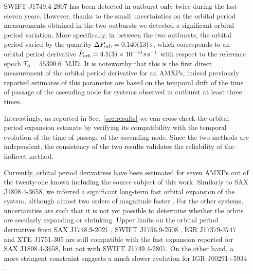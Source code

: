 \documentclass[fleqn,usenatbib]{mnras}
\newcommand{\swiftj}{SWIFT J1749.4-2807}
\begin{document}
\swiftj{} has been detected in outburst only twice during the last eleven years. However, thanks to the small uncertainties on the orbital period measurements obtained in the two outbursts we detected a significant orbital period variation. More specifically, in between the two outbursts, the orbital period varied by the quantity $\Delta P_{\rm orb}=0.140(13)\,\text{s}$, which corresponds to an orbital period derivative $\dot{P}_{\rm orb}=4.1(3)\times 10^{-10}\,\text{s}\,\text{s}^{-1}$ with respect to the reference epoch $T_0 = 55300.6$~MJD. It is noteworthy that this is the first direct measurement of the orbital period derivative for an AMXPs, indeed previously reported estimates of this parameter are based on the temporal drift of the time of passage of the ascending node for systems observed in outburst at least three times.  

Interestingly, as reported in Sec.~\ref{sec:results} we can cross-check the orbital period expansion estimate by verifying its compatibility with the temporal evolution of the time of passage of the ascending node. Since the two methods are independent, the consistency of the two results validates the reliability of the indirect method.  

Currently, orbital period derivatives have been estimated for seven AMXPs out of the twenty-one known including the source subject of this work. Similarly to SAX J1808.4-3658, we inferred a significant long-term fast orbital expansion of the system, although almost two orders of magnitude faster \citep[$\dot{P}_{\rm orb}=1.7(5)\,\times 10^{-12}\text{s}\,\text{s}^{-1}$, see e.g.,][]{di-Salvo:2008uu, Patruno:2017ah,Sanna:2017vj,Bult:2020tu}. For the other systems, uncertainties are such that it is not yet possible to determine whether the orbits are secularly expanding or shrinking. Upper limits on the orbital period derivatives from SAX J1748.9-2021 \citep[$\dot{P}_{\rm orb}$ in the range $(-0.7\,\mbox{--}\,8.4)\times 10^{-11}\text{s}\,\text{s}^{-1}$][in prep.]{Sanna2022}, SWIFT J1756.9-2508 \citep[$\dot{P}_{\rm orb}$ ranging between $(-4.1\,\mbox{--}\,7.1)\times 10^{-12}\text{s}\,\text{s}^{-1}$, see e.g.,][]{Bult:2018ve,Sanna:2018aa}, IGR J17379-3747 \citep[$\dot{P}_{\rm orb}$ between $(-9.4\,\mbox{--}\,4.4)\times 10^{-12}\text{s}\,\text{s}^{-1}$][]{Sanna:2018tx} and XTE J1751-305 \citep[$\dot{P}_{\rm orb}$ between $(-2.7\,\mbox{--}\,0.7)\times 10^{-11}\text{s}\,\text{s}^{-1}$;][in prep.]{Riggio2022} are still compatible with the fast expansion reported for SAX J1808.4-3658, but not with \swiftj{}. On the other hand, a more stringent constraint suggests a much slower evolution for IGR J00291+5934 \citep[$\dot{P}_{\rm orb}$ between $(-6.6\,\mbox{--}\,6.5)\times 10^{-13}\text{s}\,\text{s}^{-1}$, see e.g.,][]{Patruno:2017vp, Sanna:2017tx}.
\end{document}
